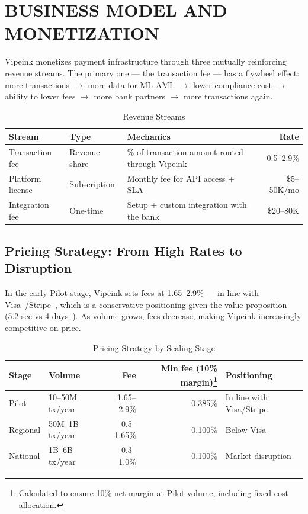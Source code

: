 \documentclass[11pt,a4paper]{article}
\begin{document}
\FloatBarrier
\section{BUSINESS MODEL AND MONETIZATION}

Vipeink monetizes payment infrastructure through three mutually reinforcing revenue streams. The primary one --- the transaction fee --- has a flywheel effect: more transactions $\to$ more data for ML-AML $\to$ lower compliance cost $\to$ ability to lower fees $\to$ more bank partners $\to$ more transactions again.

\begin{table}[htbp]
\centering
\caption{Revenue Streams}
\begin{tabularx}{\linewidth}{@{}llXr@{}}
\toprule
\textbf{Stream} & \textbf{Type} & \textbf{Mechanics} & \textbf{Rate} \\
\midrule
Transaction fee       & Revenue share  & \% of transaction amount routed through Vipeink    & 0.5--2.9\%   \\
Platform license      & Subscription   & Monthly fee for API access + SLA                   & \$5--50K/mo  \\
Integration fee       & One-time       & Setup + custom integration with the bank            & \$20--80K    \\
\bottomrule
\end{tabularx}
\end{table}

\subsection*{Pricing Strategy: From High Rates to Disruption}

In the early Pilot stage, Vipeink sets fees at 1.65--2.9\% --- in line with Visa~\cite{visa_ar}/Stripe~\cite{stripe_pricing}, which is a conservative positioning given the value proposition (5.2 sec vs 4 days~\cite{swift_mt103}). As volume grows, fees decrease, making Vipeink increasingly competitive on price.

\begin{table}[htbp]
\centering
\caption{Pricing Strategy by Scaling Stage}
\small
\begin{tabularx}{\linewidth}{@{}llrrX@{}}
\toprule
\textbf{Stage} & \textbf{Volume} & \textbf{Fee} & \textbf{Min fee (10\% margin)\footnote{Calculated to ensure 10\% net margin at Pilot volume, including fixed cost allocation.}} & \textbf{Positioning} \\
\midrule
Pilot    & 10--50M tx/year  & 1.65--2.9\% & 0.385\% & In line with Visa/Stripe~\cite{visa_ar,stripe_pricing} \\
Regional & 50M--1B tx/year  & 0.5--1.65\% & 0.100\% & Below Visa~\cite{visa_ar} \\
National & 1B--6B tx/year   & 0.3--1.0\%  & 0.100\% & Market disruption \\
\bottomrule
\end{tabularx}
\end{table}
\end{document}
